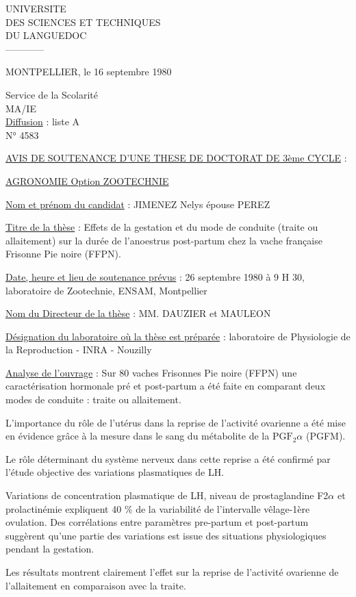 

UNIVERSITE\\
DES SCIENCES ET TECHNIQUES\\
DU LANGUEDOC\\
------------

MONTPELLIER, le 16 septembre 1980

Service de la Scolarité\\
MA/IE\\
\uline{Diffusion} : liste A\\
N° 4583

\uline{AVIS DE SOUTENANCE D'UNE THESE DE DOCTORAT DE 3ème CYCLE} :

\uline{AGRONOMIE Option ZOOTECHNIE}

\uline{Nom et prénom du candidat} : JIMENEZ Nelys épouse PEREZ

\uline{Titre de la thèse} : Effets de la gestation et du mode de conduite (traite ou allaitement) sur la durée de l'anoestrus post-partum chez la vache française Frisonne Pie noire (FFPN).

\uline{Date, heure et lieu de soutenance prévus} : 26 septembre 1980 à 9 H 30, laboratoire de Zootechnie, ENSAM, Montpellier

\uline{Nom du Directeur de la thèse} : MM. DAUZIER et MAULEON

\uline{Désignation du laboratoire où la thèse est préparée} : laboratoire de Physiologie de la Reproduction - INRA - Nouzilly

\uline{Analyse de l'ouvrage} : Sur 80 vaches Frisonnes Pie noire (FFPN) une caractérisation hormonale pré et post-partum a été faite en comparant deux modes de conduite : traite ou allaitement.

L'importance du rôle de l'utérus dans la reprise de l'activité ovarienne a été  mise en évidence grâce à la mesure dans le sang du métabolite de la $\mathrm{PGF}_2\alpha$ (PGFM).

Le rôle déterminant du système nerveux dans cette reprise a été confirmé par l'étude objective des variations plasmatiques de LH.

Variations de concentration plasmatique de LH, niveau de prostaglandine F2$\alpha$ et prolactinémie expliquent 40 \% de la variabilité de l'intervalle vêlage-1ère ovulation. Des corrélations entre paramètres pre-partum et post-partum suggèrent qu'une partie des variations est issue des situations physiologiques pendant la gestation.

Les résultats montrent clairement l'effet  sur la reprise de l'activité ovarienne de l'allaitement en comparaison avec la traite.

